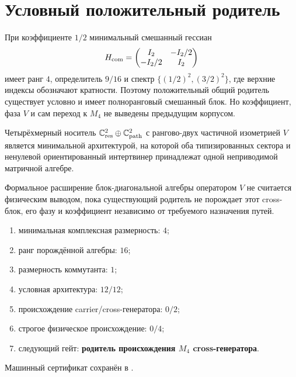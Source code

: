 \section{Условный положительный родитель}

При коэффициенте $1/2$ минимальный смешанный гессиан
\begin{equation}
 H_{\rm com}=\begin{pmatrix}I_2&-I_2/2\\-I_2/2&I_2\end{pmatrix}
\end{equation}
имеет ранг $4$, определитель $9/16$ и спектр
$\{(1/2)^2,(3/2)^2\}$, где верхние индексы обозначают кратности. Поэтому
положительный общий родитель существует условно и имеет полноранговый
смешанный блок. Но коэффициент, фаза $V$ и сам переход к $M_4$ не выведены
предыдущим корпусом.

\begin{theorem}
Четырёхмерный носитель $\mathbb C^2_{\rm res}\oplus\mathbb C^2_{\rm path}$
с рангово-двух частичной изометрией $V$ является минимальной архитектурой,
на которой оба типизированных сектора и ненулевой ориентированный
интертвинер принадлежат одной неприводимой матричной алгебре.
\end{theorem}

\begin{nogocriterion}
Формальное расширение блок-диагональной алгебры оператором $V$ не считается
физическим выводом, пока существующий родитель не порождает этот cross-блок,
его фазу и коэффициент независимо от требуемого назначения путей.
\end{nogocriterion}

\begin{protocol}\begin{enumerate}
\item минимальная комплексная размерность: \textbf{$4$};
\item ранг порождённой алгебры: \textbf{$16$};
\item размерность коммутанта: \textbf{$1$};
\item условная архитектура: \textbf{$12/12$};
\item происхождение carrier/cross-генератора: \textbf{$0/2$};
\item строгое физическое происхождение: \textbf{$0/4$};
\item следующий гейт: \textbf{родитель происхождения $M_4$ cross-генератора}.
\end{enumerate}\end{protocol}

Машинный сертификат сохранён в
.